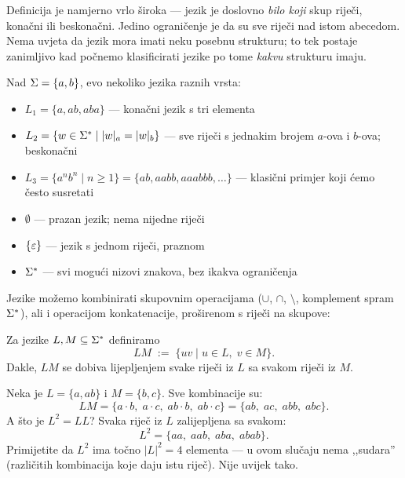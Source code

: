 Definicija je namjerno vrlo široka --- jezik je doslovno \emph{bilo koji}
skup riječi, konačni ili beskonačni. Jedino ograničenje je da su sve riječi
nad istom abecedom. Nema uvjeta da jezik mora imati neku posebnu strukturu;
to tek postaje zanimljivo kad počnemo klasificirati jezike po tome
\emph{kakvu} strukturu imaju.

\begin{primjer}
Nad $\Sigma = \{a, b\}$, evo nekoliko jezika raznih vrsta:
\begin{itemize}
  \item $L_1 = \{a, ab, aba\}$ --- konačni jezik s tri elementa
  \item $L_2 = \{w \in \Sigma^* \mid |w|_a = |w|_b\}$ --- sve riječi s jednakim
        brojem $a$-ova i $b$-ova; beskonačni
  \item $L_3 = \{a^n b^n \mid n \geq 1\} = \{ab, aabb, aaabbb, \ldots\}$ ---
        klasični primjer koji ćemo često susretati
  \item $\emptyset$ --- prazan jezik; nema nijedne riječi
  \item $\{\varepsilon\}$ --- jezik s jednom riječi, praznom
  \item $\Sigma^*$ --- svi mogući nizovi znakova, bez ikakva ograničenja
\end{itemize}
\end{primjer}

Jezike možemo kombinirati skupovnim operacijama ($\cup$, $\cap$,
$\setminus$, komplement spram $\Sigma^*$), ali i operacijom konkatenacije,
proširenom s riječi na skupove:

\begin{definicija}
Za jezike $L, M \subseteq \Sigma^*$ definiramo
\[
  LM \;:=\; \{uv \mid u \in L,\; v \in M\}.
\]
Dakle, $LM$ se dobiva lijepljenjem svake riječi iz $L$ sa svakom riječi iz $M$.
\end{definicija}

\begin{primjer}
Neka je $L = \{a, ab\}$ i $M = \{b, c\}$. Sve kombinacije su:
\[
  LM = \{a \cdot b,\; a \cdot c,\; ab \cdot b,\; ab \cdot c\}
     = \{ab,\; ac,\; abb,\; abc\}.
\]
A što je $L^2 = LL$? Svaka riječ iz $L$ zalijepljena sa svakom:
\[
  L^2 = \{aa,\; aab,\; aba,\; abab\}.
\]
Primijetite da $L^2$ ima točno $|L|^2 = 4$ elementa --- u ovom slučaju
nema ,,sudara'' (različitih kombinacija koje daju istu riječ). Nije
uvijek tako.
\end{primjer}

